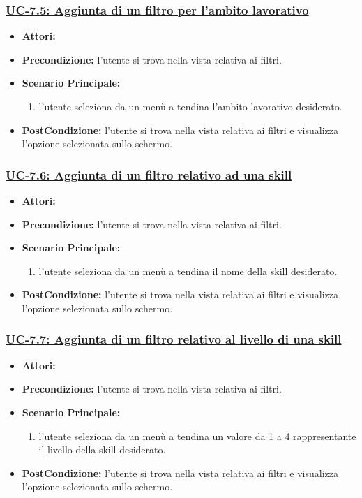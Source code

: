 \subsubsection{\underline{UC-7.5: Aggiunta di un filtro per l'ambito lavorativo}}
\begin{itemize}
	\item \textbf{Attori:}\loggedusr
	\item \textbf{Precondizione:} l'utente si trova nella vista relativa ai filtri.
	\item \textbf{Scenario Principale:}
	\begin{enumerate}
		\item l'utente seleziona da un menù a tendina l'ambito lavorativo desiderato.
	\end{enumerate}
	\item \textbf{PostCondizione:}  l'utente si trova nella vista relativa ai filtri e visualizza l'opzione selezionata sullo schermo.
\end{itemize}

\subsubsection{\underline{UC-7.6: Aggiunta di un filtro relativo ad una skill }}
\begin{itemize}
	\item \textbf{Attori:}\loggedusr
	\item \textbf{Precondizione:} l'utente si trova nella vista relativa ai filtri.
	\item \textbf{Scenario Principale:}
	\begin{enumerate}
		\item l'utente seleziona da un menù a tendina il nome della skill desiderato.
	\end{enumerate}
	\item \textbf{PostCondizione:}  l'utente si trova nella vista relativa ai filtri e visualizza l'opzione selezionata sullo schermo.
\end{itemize}

\subsubsection{\underline{UC-7.7: Aggiunta di un filtro relativo al livello di una skill}}
\begin{itemize}
	\item \textbf{Attori:}\loggedusr
	\item \textbf{Precondizione:} l'utente si trova nella vista relativa ai filtri.
	\item \textbf{Scenario Principale:}
	\begin{enumerate}
		\item l'utente seleziona da un menù a tendina un valore da 1 a 4 rappresentante il livello della skill desiderato.
	\end{enumerate}
	\item \textbf{PostCondizione:}  l'utente si trova nella vista relativa ai filtri e visualizza l'opzione selezionata sullo schermo.
\end{itemize}


